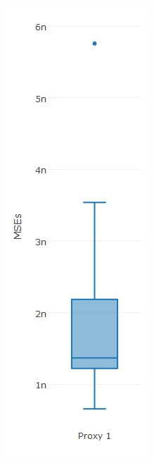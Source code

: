 \begin{figure}[!h]
{\begin{subfigure}{.25\linewidth}
  \includegraphics[width=\linewidth]{img/10ysigmaMsebp.png}

\end{subfigure}}
\end{figure}
